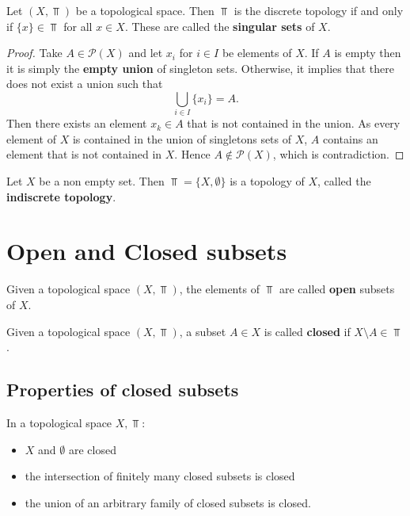 \documentclass[../../main/main.tex]{subfiles}
\begin{document}
\begin{remark}
  Let $(X, \Top)$ be a topological space. Then $\Top$ is the discrete topology if and only if $\{x\} \in \Top$ for all $x \in X$. These are called the {\bf singular sets} of $X$.
\end{remark}
\begin{proof}
  Take $A \in \mathcal{P}(X)$ and let $x_{i}$ for $i \in I$ be elements of $X$. If $A$ is empty then it is simply the {\bf empty union} of singleton sets. Otherwise, it implies that there does not exist a union such that
  \begin{equation*}
    \bigcup_{i \in I} \{x_{i}\} = A.
  \end{equation*}
  Then there exists an element $x_{k} \in A$ that is not contained in the union. As every element of $X$ is contained in the union of singletons sets of $X$, $A$ contains an element that is not contained in $X$. Hence $A \notin \mathcal{P}(X)$, which is contradiction.
\end{proof}

\begin{definition}
  \label{def:indiscrete-topology}
  Let $X$ be a non empty set. Then $\Top = \{X, \emptyset \}$ is a topology of $X$, called the {\bf indiscrete topology}.
\end{definition}

\section{Open and Closed subsets}
\label{sec:open-closed-subsets}

\begin{definition}
  Given a topological space $(X, \Top)$, the elements of $\Top$ are called {\bf open} subsets of $X$.
\end{definition}

\begin{definition}
  Given a topological space $(X, \Top)$, a subset $A \in X$ is called {\bf closed} if $X \setminus A \in \Top$.
\end{definition}

\subsection{Properties of closed subsets}
\label{sec:prop-closed-subsets}

In a topological space $X, \Top$:
\begin{itemize}
    \item $X$ and $\emptyset$ are closed
    \item the intersection of finitely many closed subsets is closed
    \item the union of an arbitrary family of closed subsets is closed.
\end{itemize}
\end{document}
